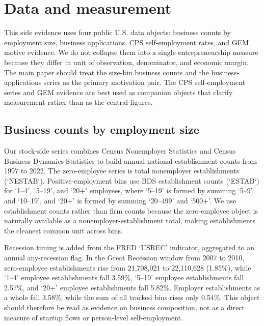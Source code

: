 
\section{Data and measurement}

This side evidence uses four public U.S. data objects: business counts by
employment size, business applications, CPS self-employment rates, and GEM
motive evidence. We do not collapse them into a single entrepreneurship
measure because they differ in unit of observation, denominator, and economic
margin. The main paper should treat the size-bin business counts and the
business-applications series as the primary motivation pair. The CPS
self-employment series and GEM evidence are best used as companion objects
that clarify measurement rather than as the central figures.

\subsection{Business counts by employment size}

Our stock-side series combines Census Nonemployer Statistics and Census
Business Dynamics Statistics to build annual national establishment counts from
1997 to 2022. The zero-employee series is total nonemployer establishments
(`NESTAB`). Positive-employment bins use BDS establishment counts (`ESTAB`) for
`1--4', `5--19', and `20+' employees, where `5--19' is formed by summing
`5--9' and `10--19', and `20+' is formed by summing `20--499' and `500+'.
We use establishment counts rather than firm counts because the zero-employee
object is naturally available as a nonemployer-establishment total, making
establishments the cleanest common unit across bins.

Recession timing is added from the FRED `USREC' indicator, aggregated to an
annual any-recession flag. In the Great Recession window from 2007 to 2010,
zero-employee establishments rise from 21,708,021 to 22,110,628 (1.85\%),
while `1--4' employee establishments fall 3.59\%, `5--19' employee
establishments fall 2.57\%, and `20+' employee establishments fall 5.82\%.
Employer establishments as a whole fall 3.58\%, while the sum of all tracked
bins rises only 0.54\%. This object should therefore be read as evidence on
business composition, not as a direct measure of startup flows or person-level
self-employment.

